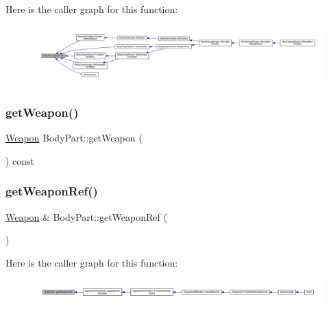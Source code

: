 Here is the caller graph for this function\+:
\nopagebreak
\begin{figure}[H]
\begin{center}
\leavevmode
\includegraphics[width=350pt]{d2/d6f/class_body_part_a1603cca73c99ce6f2f2ca5c73e387594_icgraph}
\end{center}
\end{figure}
\mbox{\label{class_body_part_a36ed7476b0b1f17d8f54d87a0553126b}} 
\subsubsection{\texorpdfstring{get\+Weapon()}{getWeapon()}}
{\footnotesize\ttfamily \mbox{\hyperlink{class_weapon}{Weapon}} Body\+Part\+::get\+Weapon (\begin{DoxyParamCaption}{ }\end{DoxyParamCaption}) const}

\mbox{\label{class_body_part_a65b38899cd3805bc1e52253f971c5978}} 
\subsubsection{\texorpdfstring{get\+Weapon\+Ref()}{getWeaponRef()}}
{\footnotesize\ttfamily \mbox{\hyperlink{class_weapon}{Weapon}} \& Body\+Part\+::get\+Weapon\+Ref (\begin{DoxyParamCaption}{ }\end{DoxyParamCaption})}

Here is the caller graph for this function\+:
\nopagebreak
\begin{figure}[H]
\begin{center}
\leavevmode
\includegraphics[width=350pt]{d2/d6f/class_body_part_a65b38899cd3805bc1e52253f971c5978_icgraph}
\end{center}
\end{figure}
\mbox{\label{class_body_part_a14b7007a9ddb15b7e3f5c6881dbf69d5}} 
